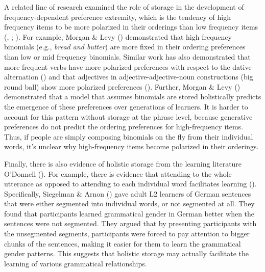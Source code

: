 \documentclass[
  12pt,
  letterpaper,
]{scrreprt}
\begin{document}
A related line of research examined the role of storage in the
development of frequency-dependent preference extremity, which is the
tendency of high frequency items to be more polarized in their orderings
than low frequency items
(,
;
). For example, Morgan \& Levy
()
demonstrated that high frequency binomials (e.g., \emph{bread and
butter}) are more fixed in their ordering preferences than low or mid
frequency binomials. Similar work has also demonstrated that more
frequent verbs have more polarized preferences with respect to the
dative alternation
() and that adjectives in adjective-adjective-noun
constructions (big round ball) show more polarized preferences
(). Further, Morgan \& Levy
()
demonstrated that a model that assumes binomials are stored holistically
predicts the emergence of these preferences over generations of
learners. It is harder to account for this pattern without storage at
the phrase level, because generative preferences do not predict the
ordering preferences for high-frequency items. Thus, if people are
simply composing binomials on the fly from their individual words, it's
unclear why high-frequency items become polarized in their orderings.

Finally, there is also evidence of holistic storage from the learning
literature O'Donnell
(). For
example, there is evidence that attending to the whole utterance as
opposed to attending to each individual word facilitates learning
(). Specifically, Siegelman \& Arnon
() gave adult L2
learners of German sentences that were either segmented into individual
words, or not segmented at all. They found that participants learned
grammatical gender in German better when the sentences were not
segmented. They argued that by presenting participants with the
unsegmented segments, participants were forced to pay attention to
bigger chunks of the sentences, making it easier for them to learn the
grammatical gender patterns. This suggests that holistic storage may
actually facilitate the learning of various grammatical relationships.
\end{document}

